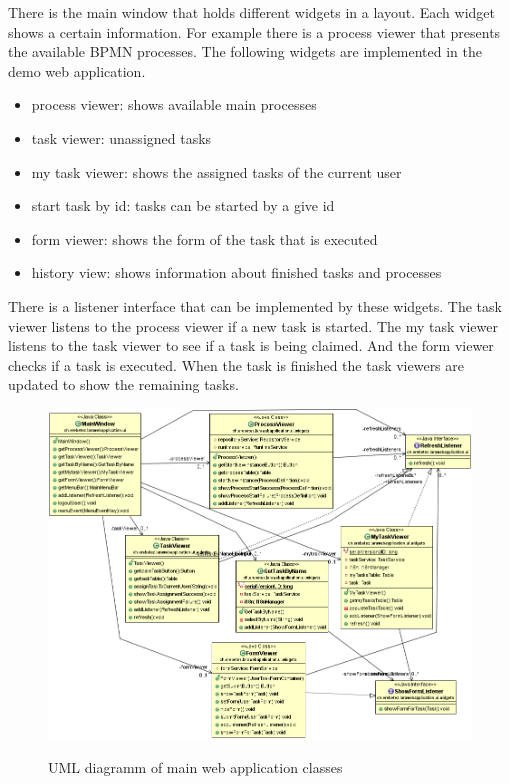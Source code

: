 \documentclass[paper=a4,twoside=false,BCOR=0mm,DIV=calc,fontsize=12pt]{scrartcl}
\begin{document}
There is the main window that holds different widgets in a layout. Each widget shows a certain
information. For example there is a process viewer that presents the available BPMN processes. 
The following widgets are implemented in the demo web application.

\begin{itemize}
 \item process viewer: shows available main processes
 \item task viewer: unassigned tasks
 \item my task viewer: shows the assigned tasks of the current user
 \item start task by id: tasks can be started by a give id
 \item form viewer: shows the form of the task that is executed
 \item history view: shows information about finished tasks and processes
\end{itemize}

There is a listener interface that can be implemented by these widgets. The task viewer listens to the process viewer if a new task is started. The
my task viewer listens to the task viewer to see if a task is being claimed. And the form viewer checks if a task is executed. When the task is
finished the task viewers are updated to show the remaining tasks.

\begin{figure}
    \begin{center}
      \includegraphics[width=1\textwidth]{./img/uml_webapp_model.png}\\
    \end{center}
  \caption{UML diagramm of main web application classes}
  \label{webapplicationclassuml}
\end{figure} 
\end{document}
